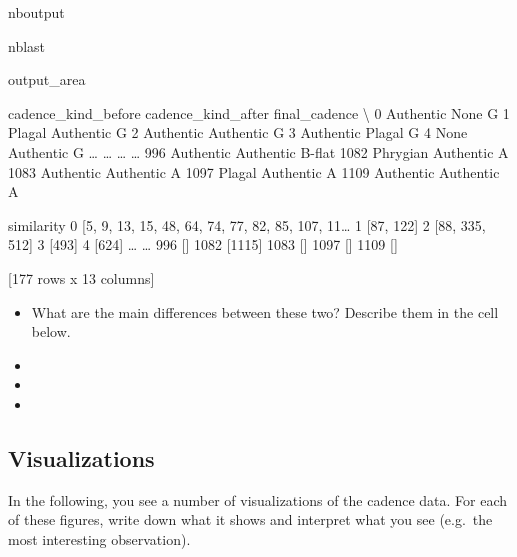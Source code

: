 \documentclass[letterpaper,10pt,english]{sphinxmanual}
\begin{document}
\begin{sphinxuseclass}{nboutput}
\begin{sphinxuseclass}{nblast}
{\begin{sphinxuseclass}{output_area}
\begin{sphinxuseclass}{}
\begin{sphinxVerbatim}[commandchars=\\\{\}]
     cadence\_kind\_before cadence\_kind\_after final\_cadence  \textbackslash{}
0              Authentic               None             G
1                 Plagal          Authentic             G
2              Authentic          Authentic             G
3              Authentic             Plagal             G
4                   None          Authentic             G
{\ldots}                  {\ldots}                {\ldots}           {\ldots}
996            Authentic          Authentic        B-flat
1082            Phrygian          Authentic             A
1083           Authentic          Authentic             A
1097              Plagal          Authentic             A
1109           Authentic          Authentic             A

                                             similarity
0     [5, 9, 13, 15, 48, 64, 74, 77, 82, 85, 107, 11{\ldots}
1                                             [87, 122]
2                                        [88, 335, 512]
3                                                 [493]
4                                                 [624]
{\ldots}                                                 {\ldots}
996                                                  []
1082                                             [1115]
1083                                                 []
1097                                                 []
1109                                                 []

[177 rows x 13 columns]
\end{sphinxVerbatim}



\end{sphinxuseclass}
\end{sphinxuseclass}
}

\end{sphinxuseclass}
\end{sphinxuseclass}\begin{itemize}
\item {} 
\sphinxAtStartPar
What are the main differences between these two? Describe them in the cell below.

\end{itemize}
\begin{itemize}
\item {} 
\item {} 
\item {} 
\end{itemize}


\subsection{Visualizations}
\label{\detokenize{exercises/02_exercise:Visualizations}}
\sphinxAtStartPar
In the following, you see a number of visualizations of the cadence data. For each of these figures, write down what it shows and interpret what you see (e.g. the most interesting observation).
\end{document}
